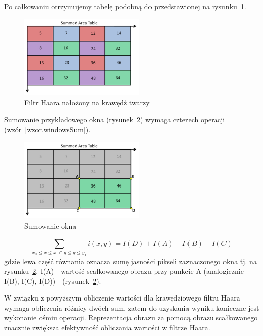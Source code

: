 \documentclass[a4paper,twoside,12pt]{book}
\begin{document}
    Po całkowaniu otrzymujemy tabelę podobną do przedstawionej na rysunku~\ref{fig.poCalkowaniu}.
    \begin{figure}
        \centering
        \includegraphics[width=6cm]{Obrazy/poCalkowaniu.jpg}
        \caption{Filtr Haara nałożony na krawędź twarzy~\cite{integralImages}}
        \label{fig.poCalkowaniu}
    \end{figure}

    Sumowanie przykładowego okna (rysunek~\ref{fig.sumowanieOkna}) wymaga czterech operacji (wzór~\ref{wzor.windowsSum}).
    \begin{figure}
        \centering
        \includegraphics[width=6cm]{Obrazy/sumowanieOkna.jpg}
        \caption{Sumowanie okna~\cite{integralImages}}
        \label{fig.sumowanieOkna}
    \end{figure}


    \large
    \begin{equation}
        \sum_{x_0\leq x \leq x_1\cap {y}\leq y \leq y_1}^{} i(x,y) = I(D) + I(A) - I(B) - I(C)
        \label{wzor.windowsSum}
    \end{equation}
    \normalsize
    gdzie lewa część równania oznacza sumę jasności pikseli
    zaznaczonego okna tj.
    na rysunku~\ref{fig.sumowanieOkna}, I(A) - wartość scałkowanego obrazu przy punkcie A
    (analogicznie I(B), I(C), I(D)) - (rysunek~\ref{fig.sumowanieOkna}).

    W związku z powyższym obliczenie wartości dla krawędziowego filtru Haara wymaga obliczenia różnicy dwóch sum, zatem do uzyskania wyniku konieczne jest wykonanie
    ośmiu operacji.
    Reprezentacja obrazu za pomocą obrazu scałkowanego znacznie zwiększa efektywność obliczania wartości w filtrze
    Haara.
\end{document}
